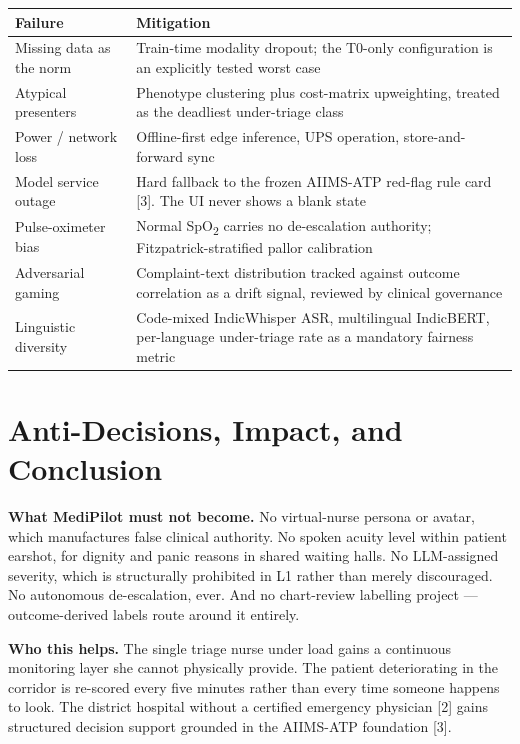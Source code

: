 \documentclass[10pt,a4paper,twocolumn]{article}
\begin{document}
\begin{center}\footnotesize\sffamily
\begin{tabular}{@{}p{1.85cm}p{5.5cm}@{}}
\toprule
\rowcolor{AccPurple!10}
\textbf{Failure} & \textbf{Mitigation}\\
\midrule
Missing data as the norm & Train-time modality dropout; the T0-only configuration is
an explicitly tested worst case\\
\addlinespace[2pt]
Atypical presenters & Phenotype clustering plus cost-matrix upweighting, treated as
the deadliest under-triage class\\
\addlinespace[2pt]
Power / network loss & Offline-first edge inference, UPS operation,
store-and-forward sync\\
\addlinespace[2pt]
Model service outage & Hard fallback to the frozen AIIMS-ATP red-flag rule card
[3]. The UI never shows a blank state\\
\addlinespace[2pt]
Pulse-oximeter bias & Normal SpO\textsubscript{2} carries no de-escalation authority;
Fitzpatrick-stratified pallor calibration\\
\addlinespace[2pt]
Adversarial gaming & Complaint-text distribution tracked against outcome correlation
as a drift signal, reviewed by clinical governance\\
\addlinespace[2pt]
Linguistic diversity & Code-mixed IndicWhisper ASR, multilingual IndicBERT,
per-language under-triage rate as a mandatory fairness metric\\
\bottomrule
\end{tabular}
\end{center}

\section{Anti-Decisions, Impact, and Conclusion}

\textbf{What MediPilot must not become.} No virtual-nurse persona or avatar, which
manufactures false clinical authority. No spoken acuity level within patient earshot,
for dignity and panic reasons in shared waiting halls. No LLM-assigned severity,
which is structurally prohibited in L1 rather than merely discouraged. No autonomous
de-escalation, ever. And no chart-review labelling project --- outcome-derived labels
route around it entirely.

\textbf{Who this helps.} The single triage nurse under load gains a continuous
monitoring layer she cannot physically provide. The patient deteriorating in the
corridor is re-scored every five minutes rather than every time someone happens to
look. The district hospital without a certified emergency physician [2]
gains structured decision support grounded in the AIIMS-ATP foundation
[3].
\end{document}
